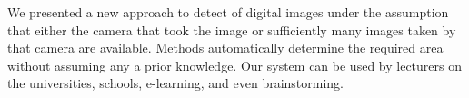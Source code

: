 We presented a new approach to detect of digital images under the assumption that either the camera that took the image or sufficiently many images taken by that camera are available. Methods automatically determine the required area without assuming any a prior knowledge.
Our system can be used by lecturers on the universities, schools, e-learning, and even brainstorming.
